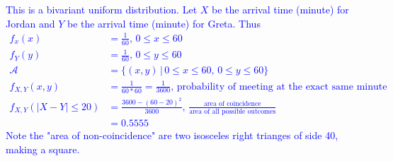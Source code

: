 \documentclass[10pt,a4paper]{report}
\newcommand{\BLUE}[1]{\textcolor{blue}{#1}}
\begin{document}
\BLUE{This is a bivariant uniform distribution.  Let $X$ be the arrival time (minute) for Jordan and $Y$ be the arrival time (minute) for Greta.  Thus
\begin{align*}
	f_x(x) &= \frac{1}{60}, \, 0\le x \le 60\\
	f_Y(y) &= \frac{1}{60}, \, 0\le y \le 60\\
	\mathcal{A} &= \{(x,y)\,|\, 0\le x \le 60,\, 0\le y \le 60 \}\\
	f_{X,Y}(x,y) &= \frac{1}{60*60} = \frac{1}{3600}, \, \text{probability of meeting at the exact same minute}\\
	f_{X,Y}(|X-Y|\le 20) &= \frac{3600-(60-20)^2}{3600},\, \frac{\text{area of coincidence}}{\text{area of all possible outcomes}} \\
	&= 0.5555
\end{align*}Note the "area of non-coincidence" are two isosceles right trianges of side 40, making a square.
}
\end{document}
